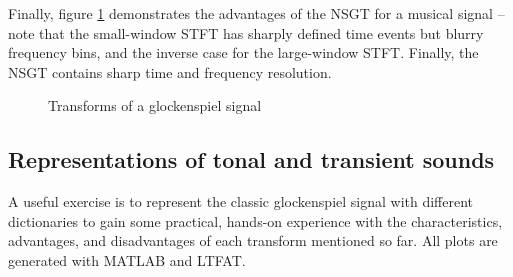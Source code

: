 \documentclass[letter,12pt]{article}
\begin{document}
Finally, figure \ref{fig:nsgtglock} demonstrates the advantages of the NSGT for a musical signal -- note that the small-window STFT has sharply defined time events but blurry frequency bins, and the inverse case for the large-window STFT. Finally, the NSGT contains sharp time and frequency resolution.

\begin{figure}[ht]
	\centering
	\hspace{0.35em}
	\hspace{0.35em}
	\caption{Transforms of a glockenspiel signal \cite{balazs}}
	\label{fig:nsgtglock}
\end{figure}

\subsection{Representations of tonal and transient sounds}

A useful exercise is to represent the classic glockenspiel signal with different dictionaries to gain some practical, hands-on experience with the characteristics, advantages, and disadvantages of each transform mentioned so far. All plots are generated with MATLAB and LTFAT.
\end{document}
